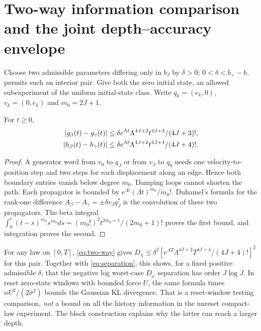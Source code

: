 \section{Two-way information comparison and the joint depth--accuracy envelope}
\label{sec:frontier}
Choose two admissible parameters differing only in $b_J$ by $\delta>0$;
$0<\delta<b_+-b_-$ permits such an interior pair. Give both the zero initial
state, an allowed subexperiment of the uniform initial-state class. Write
$q_k=(e_k,0)$, $v_k=(0,e_k)$ and $m_0=2J+1$.

\begin{lemma}
\label{lem:two-way}
For $t\ge0$,
\begin{align}
 |g_\beta(t)-g_\gamma(t)|
 &\le\delta e^{\Lambda t}\Lambda^{4J+2}t^{4J+3}/(4J+3)!,\notag\\
 |h_\beta(t)-h_\gamma(t)|
 &\le\delta e^{\Lambda t}\Lambda^{4J+2}t^{4J+4}/(4J+4)!.
 \label{eq:two-way}
\end{align}
\end{lemma}
\begin{proof}
A generator word from $v_0$ to $q_J$ or from $v_J$ to $q_0$ needs one
velocity-to-position step and two steps for each displacement along an edge.
Hence both boundary entries vanish below degree $m_0$. Damping loops cannot
shorten the path. Each propagator is bounded by
$e^{\Lambda t}(\Lambda t)^{m_0}/m_0!$.
Duhamel's formula for the rank-one difference $A_\beta-A_\gamma=\pm\delta v_Jq_J^*$
is the convolution of these two propagators. The beta integral
$\int_0^t(t-s)^{m_0}s^{m_0}ds=(m_0!)^2t^{2m_0+1}/(2m_0+1)!$
proves the first bound, and integration proves the second.
\end{proof}

For any law on $[0,T]$, \eqref{eq:two-way} gives
$D_\chi\le\delta^2[e^{\Lambda T}\Lambda^{4J+2}T^{4J+4}/(4J+4)!]^2$ for this
pair. Together with \eqref{eq:separation}, this shows, for a fixed positive
admissible $\delta$, that the negative log worst-case $D_\omega$ separation
has order $J\log J$. In reset zero-state windows with bounded force $U$, the
same formula times $nU^2/(2\sigma^2)$ bounds the Gaussian KL divergence.
That is a reset-window testing comparison, \emph{not} a bound on all the
history information in the unreset compact-law experiment. The block
construction explains why the latter can reach a larger depth.

